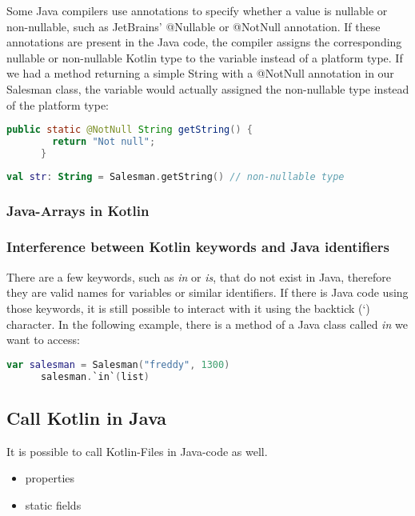 \documentclass[a4paper, 11pt]{article}
\begin{document}
    Some Java compilers use annotations to specify whether a value is nullable or non-nullable, such as JetBrains' @Nullable or @NotNull annotation. If these annotations are present in the Java code, the compiler assigns the corresponding nullable or non-nullable Kotlin type to the variable instead of a platform type. If we had a method returning a simple String with a @NotNull annotation in our Salesman class, the variable would actually assigned the non-nullable type instead of the platform type:
    \begin{lstlisting}[language=Java]
      public static @NotNull String getString() {
        return "Not null";
      }
    \end{lstlisting}
    \begin{lstlisting}[language=Kotlin]
      val str: String = Salesman.getString() // non-nullable type
    \end{lstlisting}

    \subsubsection{Java-Arrays in Kotlin}

    \subsubsection{Interference between Kotlin keywords and Java identifiers}
    There are a few keywords, such as \textit{in} or \textit{is}, that do not exist in Java, therefore they are valid names for variables or similar identifiers. If there is Java code using those keywords, it is still possible to interact with it using the backtick (`) character. In the following example, there is a method of a Java class called \textit{in} we want to access:
    \begin{lstlisting}[language=Kotlin]
      var salesman = Salesman("freddy", 1300)
      salesman.`in`(list)
    \end{lstlisting}











\subsection{Call Kotlin in Java}
  It is possible to call Kotlin-Files in Java-code as well.
  \begin{itemize}
    \item properties
    \item static fields
  \end{itemize}
\end{document}
